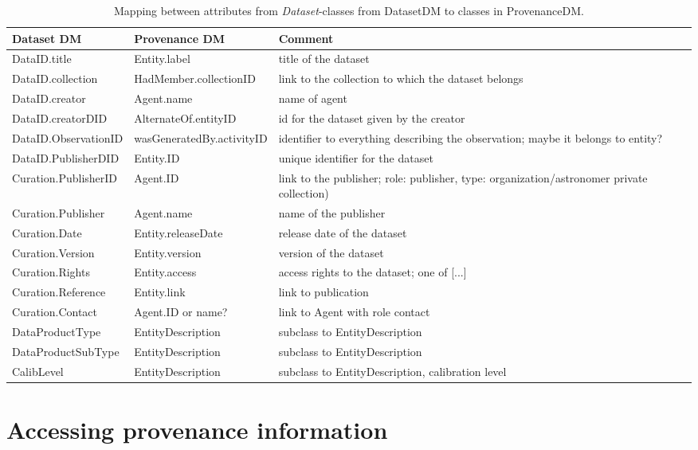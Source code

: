 \documentclass[11pt,a4paper]{ivoa}
\newcommand{\head}[1]{\textbf{#1}}
\newcommand{\class}[1]{\emph{#1}}
\begin{document}
\begin{table}[h]
\small
{}\textwidth
\begin{tabulary}{1.0\textwidth}{@{}lLp{4cm}@{}}
\toprule
\head{Dataset DM} & \head{Provenance DM} & \head{Comment}\\
\midrule
DataID.title      & Entity.label               & title of the dataset\\
DataID.collection    & HadMember.collectionID  & link to the collection to which the dataset belongs\\
DataID.creator       & Agent.name          & name of agent\\ 
DataID.creatorDID    & AlternateOf.entityID     & id for the dataset given by the creator\\
DataID.ObservationID & wasGeneratedBy.activityID  & identifier to everything describing the observation; maybe it belongs to entity?\\
DataID.PublisherDID  & Entity.ID      & unique identifier for the dataset\\
Curation.PublisherID & Agent.ID  & link to the publisher; role: publisher, type: organization/astronomer private collection)\\
Curation.Publisher     & Agent.name & name of the publisher\\
Curation.Date          & Entity.releaseDate & release date of the dataset\\
Curation.Version       & Entity.version     & version of the dataset\\
Curation.Rights        & Entity.access      & access rights to the dataset; one of [...]\\
Curation.Reference     & Entity.link        & link to publication\\
Curation.Contact       & Agent.ID or name? & link to Agent with role contact\\
DataProductType  & EntityDescription & subclass to EntityDescription\\
DataProductSubType & EntityDescription & subclass to EntityDescription\\
CalibLevel       & EntityDescription & subclass to EntityDescription, calibration level\\\hline
\bottomrule
\end{tabulary}
\caption{Mapping between attributes from \class{Dataset}-classes from DatasetDM to classes in ProvenanceDM.}
\label{tab:datasetmapping}
\end{table}


\section{Accessing provenance information}

\end{document}

